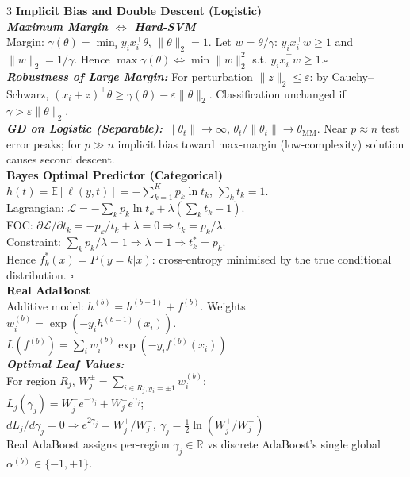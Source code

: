 \documentclass[a4paper,7pt]{article}
\begin{document}
\begin{multicols*}{3}
\textbf{Implicit Bias and Double Descent (Logistic)}\\

\textit{\textbf{Maximum Margin $\Leftrightarrow$ Hard-SVM}}\\
Margin: $\gamma(\theta)=\min_i y_i x_i^\top\theta$, $\|\theta\|_2=1$. Let $w=\theta/\gamma$: $y_i x_i^\top w\geq 1$ and $\|w\|_2=1/\gamma$. Hence $\max\gamma(\theta)\Leftrightarrow\min\|w\|_2^2$ s.t. $y_i x_i^\top w\geq 1$.\hfill$\square$\\

\textit{\textbf{Robustness of Large Margin:}} For perturbation $\|z\|_2\leq\varepsilon$: by Cauchy--Schwarz, $(x_i+z)^\top\theta\geq\gamma(\theta)-\varepsilon\|\theta\|_2$. Classification unchanged if $\gamma>\varepsilon\|\theta\|_2$.\\

\textit{\textbf{GD on Logistic (Separable):}} $\|\theta_t\|\to\infty$, $\theta_t/\|\theta_t\|\to\theta_\mathrm{MM}$. Near $p\approx n$ test error peaks; for $p\gg n$ implicit bias toward max-margin (low-complexity) solution causes second descent.\\

\textbf{Bayes Optimal Predictor (Categorical)}\\
$h(t)=\mathbb{E}[\ell(y,t)]=-\sum_{k=1}^K p_k\ln t_k$, $\sum_k t_k=1$.\\
Lagrangian: $\mathcal{L}=-\sum_k p_k\ln t_k+\lambda(\sum_k t_k-1)$.\\
FOC: $\partial\mathcal{L}/\partial t_k=-p_k/t_k+\lambda=0\Rightarrow t_k=p_k/\lambda$.\\
Constraint: $\sum_k p_k/\lambda=1\Rightarrow\lambda=1\Rightarrow t_k^*=p_k$.\\
Hence $f_k^*(x)=P(y=k|x)$: cross-entropy minimised by the true conditional distribution. \hfill$\square$\\

\textbf{Real AdaBoost}\\
Additive model: $h^{(b)}=h^{(b-1)}+f^{(b)}$. Weights $w_i^{(b)}=\exp(-y_i h^{(b-1)}(x_i))$.\\
$L(f^{(b)})=\sum_i w_i^{(b)}\exp(-y_i f^{(b)}(x_i))$\\

\textit{\textbf{Optimal Leaf Values:}}\\ For region $R_j$, $W_j^\pm=\sum_{i\in R_j,y_i=\pm1}w_i^{(b)}$:\\
$L_j(\gamma_j)=W_j^+e^{-\gamma_j}+W_j^-e^{\gamma_j}$; \\
$dL_j/d\gamma_j=0\Rightarrow e^{2\gamma_j}=W_j^+/W_j^-$, $\gamma_j=\tfrac{1}{2}\ln(W_j^+/W_j^-)$\\
Real AdaBoost assigns per-region $\gamma_j\in\mathbb{R}$ vs discrete AdaBoost's single global $\alpha^{(b)}\in\{-1,+1\}$.\\


\end{multicols*}
\end{document}
